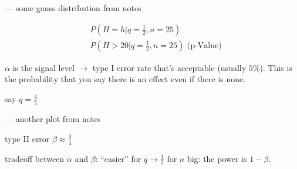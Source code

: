 --- some gauss distribution from notes

\begin{align*}
&P\left(H=h |q=\frac{1}{2},n=25\right) \\
&P\left(H>20 |q=\frac{1}{2},n=25\right) \mbox{ (p-Value)}
\end{align*}

$\alpha$ is the signal level $\rightarrow$ type I error rate that's acceptable (usually $5\%$). This is the probability that you say there is an effect even if there is none.

say $q = \frac{4}{5}$

--- another plot from notes

type II error $\beta \approx \frac{3}{4}$

tradeoff between $\alpha$ and $\beta$: ``easier'' for $q \rightarrow \frac{1}{2}$ for $n$ big: the power is $1-\beta$.